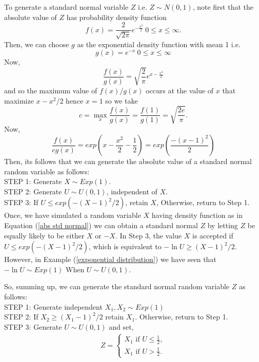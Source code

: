 \begin{example}
    To generate a standard normal variable $Z$ i.e. $Z\sim N(0,1)$, note first that the absolute value of  $Z$ has probability density function
    \begin{equation}
        \label{abs std normal}
        f(x) = \frac{2}{\sqrt{2\pi}}e^{- \frac{x^{2}}{2}} \ 0\le x \le \infty.
    \end{equation}
    Then, we can choose $g$ as the exponential density function with mean 1 i.e. 
     \[
    g(x) = e^{-x}\ 0\le x\le \infty
    \] 
    Now, 
    \[
        \frac{f(x)}{g(x)} = \sqrt{\frac{2}{\pi}} e^{x-\frac{x^{2}}{2}}
    \] 
    and so the maximum value of $f(x)/g(x)$ occurs at the value of $x$ that maximize $x-x^2 /2$ hence $x=1$ so we take 
    \[
        c = \max_x \frac{f(x)}{g(x)} = \frac{f(1)}{g(1)} = \sqrt{\frac{2e}{\pi}}. 
    \] 
    Now, 
    \[
    \frac{f(x)}{cg(x)} = exp\left( x-\frac{x^2}{2}-\frac{1}{2} \right) = exp\left( \frac{-(x-1)^2}{2} \right)
    \] 
    Then, its follows that we can generate the absolute value of a standard normal random variable as follows: \\
    STEP 1: Generate $X\sim Exp(1)$. \\
    STEP 2: Generate $U\sim U(0,1)$, independent of $X$.\\ 
    STEP 3: If  $U\le exp\left( -(X-1)^2 /2 \right)$, retain  $X$, Otherwise, return to Step 1.\\
    
    Once, we have simulated a random variable $X$ having density function as in 
    Equation (\ref{abs std normal}) we can obtain a standard normal $Z$ by letting
    $Z$ be equally likely to be either  $X$ or  $-X$.
    In Step 3, the value $X$ is accepted if  $U\le exp\left( -(X-1)^2 /2 \right)$, which is equivalent to $- \ln U\ge (X-1)^2 /2$.
However, in Example (\ref{exponential distribution}) we have seen that $-\ln{U}\sim Exp(1)$ When $U\sim U(0,1)$.

So, summing up, we can generate the standard normal random variable $Z$ as follows:\\
STEP 1: Generate independent $X_1, X_2\sim Exp(1) $\\ 
STEP 2: If $X_2\ge (X_1-1)^2 /2$ retain $X_1$. Otherwise, return to Step 1.\\ 
STEP 3: Generate $U\sim U(0,1)$ and set, 
\begin{eqnarray*}
    Z=
    \begin{cases}
        X_1 \text{ if } U\le \frac{1}{2},\\ 
        X_1 \text{ if } U> \frac{1}{2}.
    \end{cases}
\end{eqnarray*}


\end{example}

